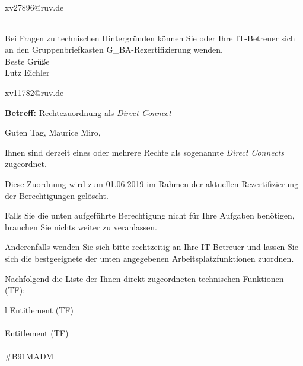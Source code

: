\documentclass[a4paper,landscape,12pt]{letter}
\begin{document}
\begin{letter}{xv27896@ruv.de\hfill \break}
\begin{tiny}
\begin{longtable}{|p{35mm}|p{15mm}|p{25mm}|p{10mm}|p{40mm}|p{50mm}|p{50mm}|}
\hline
		\end{longtable}
		\end{tiny}
	
\begin{minipage}{\textwidth}
			Bei Fragen zu technischen Hintergründen können Sie 
			oder Ihre IT-Betreuer sich an den Gruppenbriefkasten 
			G\_BA-Rezertifizierung
			wenden.\\
			\linebreak
			Beste Grüße\\
			Lutz Eichler
	\end{minipage}
	\end{letter}
	
\begin{letter}{xv11782@ruv.de\hfill \break}
\begin{normalsize}
	\opening{\textbf{Betreff:} Rechtezuordnung als \emph{Direct Connect}}
	\begin{normalsize} \hfill
	\end{normalsize}

	\begin{normalsize}
		Guten Tag, 
	Maurice Miro, \hfill \break
	\end{normalsize}
	\end{normalsize}
	
\begin{normalsize}
	Ihnen sind derzeit eines oder mehrere Rechte als sogenannte \emph{Direct Connects} zugeordnet.
	
	Diese Zuordnung wird zum 01.06.2019 im Rahmen der aktuellen Rezertifizierung der Berechtigungen gelöscht.
	
	Falls Sie die unten aufgeführte Berechtigung nicht für Ihre Aufgaben benötigen, 
	brauchen Sie nichts weiter zu veranlassen.
	
	Anderenfalls wenden Sie sich bitte rechtzeitig an Ihre IT-Betreuer 
	und lassen Sie sich die bestgeeignete der unten angegebenen Arbeitsplatzfunktionen zuordnen.
	\end{normalsize}
	
\begin{normalsize}
	Nachfolgend die Liste der Ihnen direkt zugeordneten technischen Funktionen (TF):

	\begin{longtable}{l}
		Entitlement (TF) \\ \hline
		\endfirsthead
		\\\hline
		Entitlement (TF) \\ \hline
		\endhead %
		\multicolumn{1}{r@{}}{Fortsetzung \ldots}\\
		\endfoot
		\hline
		\endlastfoot
	\#B91MADM\\
	\end{longtable}
	\end{normalsize}
	

\end{letter}
\end{document}
